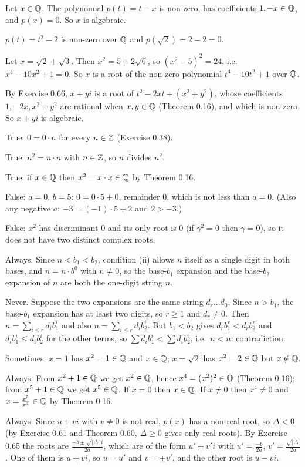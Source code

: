  Let $x\in\mathbb{Q}$. The polynomial $p(t)=t-x$ is non-zero, has coefficients $1,-x\in\mathbb{Q}$, and $p(x)=0$. So $x$ is algebraic.

 $p(t)=t^2-2$ is non-zero over $\mathbb{Q}$ and $p(\sqrt2)=2-2=0$.

 Let $x=\sqrt2+\sqrt3$. Then $x^2=5+2\sqrt6$, so $(x^2-5)^2=24$, i.e.\ $x^4-10x^2+1=0$. So $x$ is a root of the non-zero polynomial $t^4-10t^2+1$ over $\mathbb{Q}$.

 By Exercise 0.66, $x+yi$ is a root of $t^2-2xt+(x^2+y^2)$, whose coefficients $1,-2x,x^2+y^2$ are rational when $x,y\in\mathbb{Q}$ (Theorem 0.16), and which is non-zero. So $x+yi$ is algebraic.

 True: $0=0\cdot n$ for every $n\in\mathbb{Z}$ (Exercise 0.38).

 True: $n^2=n\cdot n$ with $n\in\mathbb{Z}$, so $n$ divides $n^2$.

 True: if $x\in\mathbb{Q}$ then $x^2=x\cdot x\in\mathbb{Q}$ by Theorem 0.16.

 False: $a=0$, $b=5$: $0=0\cdot5+0$, remainder $0$, which is not less than $a=0$. (Also any negative $a$: $-3=(-1)\cdot5+2$ and $2>-3$.)

 False: $x^2$ has discriminant $0$ and its only root is $0$ (if $\gamma^2=0$ then $\gamma=0$), so it does not have two distinct complex roots.

 Always. Since $n<b_1<b_2$, condition (ii) allows $n$ itself as a single digit in both bases, and $n=n\cdot b^0$ with $n\ne0$, so the base-$b_1$ expansion and the base-$b_2$ expansion of $n$ are both the one-digit string $n$.

 Never. Suppose the two expansions are the same string $d_r\dots d_0$. Since $n>b_1$, the base-$b_1$ expansion has at least two digits, so $r\ge1$ and $d_r\ne0$. Then $n=\sum_{i\le r}d_ib_1^i$ and also $n=\sum_{i\le r}d_ib_2^i$. But $b_1<b_2$ gives $d_rb_1^r<d_rb_2^r$ and $d_ib_1^i\le d_ib_2^i$ for the other terms, so $\sum d_ib_1^i<\sum d_ib_2^i$, i.e.\ $n<n$: contradiction.

 Sometimes: $x=1$ has $x^2=1\in\mathbb{Q}$ and $x\in\mathbb{Q}$; $x=\sqrt2$ has $x^2=2\in\mathbb{Q}$ but $x\notin\mathbb{Q}$.

 Always. From $x^2+1\in\mathbb{Q}$ we get $x^2\in\mathbb{Q}$, hence $x^4=(x^2)^2\in\mathbb{Q}$ (Theorem 0.16); from $x^5+1\in\mathbb{Q}$ we get $x^5\in\mathbb{Q}$. If $x=0$ then $x\in\mathbb{Q}$. If $x\ne0$ then $x^4\ne0$ and $x=\frac{x^5}{x^4}\in\mathbb{Q}$ by Theorem 0.16.

 Always. Since $u+vi$ with $v\ne0$ is not real, $p(x)$ has a non-real root, so $\Delta<0$ (by Exercise 0.61 and Theorem 0.60, $\Delta\ge0$ gives only real roots). By Exercise 0.65 the roots are $\frac{-b\pm\sqrt{|\Delta|}\,i}{2a}$, which are of the form $u'\pm v'i$ with $u'=\frac{-b}{2a}$, $v'=\frac{\sqrt{|\Delta|}}{2a}$. One of them is $u+vi$, so $u=u'$ and $v=\pm v'$, and the other root is $u-vi$.

